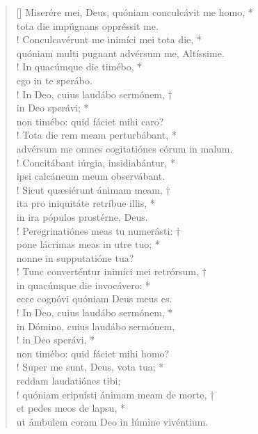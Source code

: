\begin{verse}[\versewidth]
Miserére mei, Deus, quóniam conculcávit me homo, *\\
tota die impúgnans oppréssit me.\\!
\vin Conculcavérunt me inimíci mei tota die, *\\
\vin quóniam multi pugnant advérsum me, Altíssime.\\!
In quacúmque die timébo, *\\
ego in te sperábo.\\!
\vin In Deo, cuius laudábo sermónem, †\\
\vin in Deo sperávi; *\\
\vin non timébo: quid fáciet mihi caro?\\!
Tota die rem meam perturbábant, *\\
advérsum me omnes cogitatiónes eórum in malum.\\!
\vin Concitábant iúrgia, insidiabántur, *\\
\vin ipsi calcáneum meum observábant.\\!
Sicut quæsiérunt ánimam meam, †\\
ita pro iniquitáte retríbue illis, *\\
in ira pópulos prostérne, Deus.\\!
\vin Peregrinatiónes meas tu numerásti: †\\
\vin pone lácrimas meas in utre tuo; *\\
\vin nonne in supputatióne tua?\\!
Tunc converténtur inimíci mei retrórsum, †\\
in quacúmque die invocávero: *\\
ecce cognóvi quóniam Deus meus es.\\!
\vin In Deo, cuius laudábo sermónem, *\\
\vin in Dómino, cuius laudábo sermónem,\\!
in Deo sperávi, *\\
non timébo: quid fáciet mihi homo?\\!
\vin Super me sunt, Deus, vota tua; *\\
\vin reddam laudatiónes tibi;\\!
quóniam eripuísti ánimam meam de morte, †\\
et pedes meos de lapsu, *\\
ut ámbulem coram Deo in lúmine vivéntium.\\
\end{verse}
\vspace{1cm}


